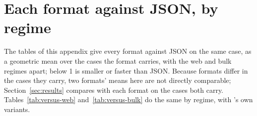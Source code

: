 \section{Each format against JSON, by regime}
\label{sec:against-json}

The tables of this appendix give every format against JSON on the same case,
as a geometric mean over the cases the format carries, with the web and bulk
regimes apart; below 1 is smaller or faster than JSON. Because formats
differ in the cases they carry, two formats' means here are not directly
comparable; Section~\ref{sec:results} compares \colbin{} with each format on
the cases both carry. Tables~\ref{tab:versus-web} and~\ref{tab:versus-bulk}
do the same by regime, with \colbin{}'s own variants.

\begin{table}[ht]
\centering\small
{}
\caption{Web regime: message size against JSON's, as written (\emph{raw})
and under each compressor, both sides compressed alike. $\dagger$: cases
where the format writes zero bytes are left out of the mean.}
\label{tab:sizes-web}
\end{table}

\begin{table}[ht]
\centering\small
{}
\caption{Bulk regime: message size against JSON's.}
\label{tab:sizes-bulk}
\end{table}

\begin{table}[ht]
\centering\footnotesize
{}
\caption{Web regime by dataset: size against JSON's, as written and under
gzip.}
\label{tab:sizes-datasets-web}
\end{table}

\begin{table}[ht]
\centering\small
{}
\caption{Web regime: time against JSON's for the same operation
( cases; access against JSON's decode-fresh, on the
 cases that have an access aggregate).}
\label{tab:times-web}
\end{table}

\begin{table}[ht]
\centering\small
{}
\caption{Bulk regime: time against JSON's for the same operation
( cases).}
\label{tab:times-bulk}
\end{table}

\begin{table}[ht]
\centering\footnotesize
{}
\caption{Web regime: \colbin{}'s number over each other format's, as a
geometric mean over the cases both carry, and in small type the number of
those cases in which \colbin{}'s is strictly lower. Below 1, \colbin{} is
smaller or faster.}
\label{tab:versus-web}
\end{table}

